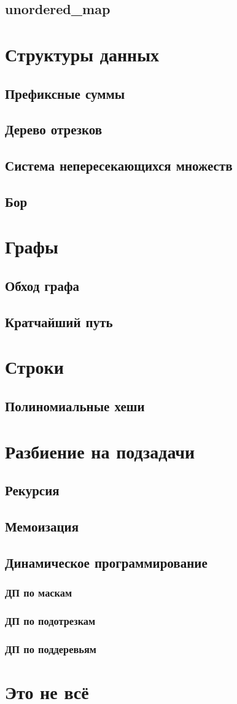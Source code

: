 \documentclass[a4paper,8pt]{article}
\begin{document}
    \subsection{unordered\_map}
\section{Структуры данных}
    \subsection{Префиксные суммы}
    \subsection{Дерево отрезков}
    \subsection{Система непересекающихся множеств}
    \subsection{Бор}
\section{Графы}
    \subsection{Обход графа}
    \subsection{Кратчайший путь}
\section{Строки}
    \subsection{Полиномиальные хеши}
\section{Разбиение на подзадачи}
    \subsection{Рекурсия}
    \subsection{Мемоизация}
    \subsection{Динамическое программирование}
        \subsubsection{ДП по маскам}
        \subsubsection{ДП по подотрезкам}
        \subsubsection{ДП по поддеревьям}
\section{Это не всё}
\end{document}

